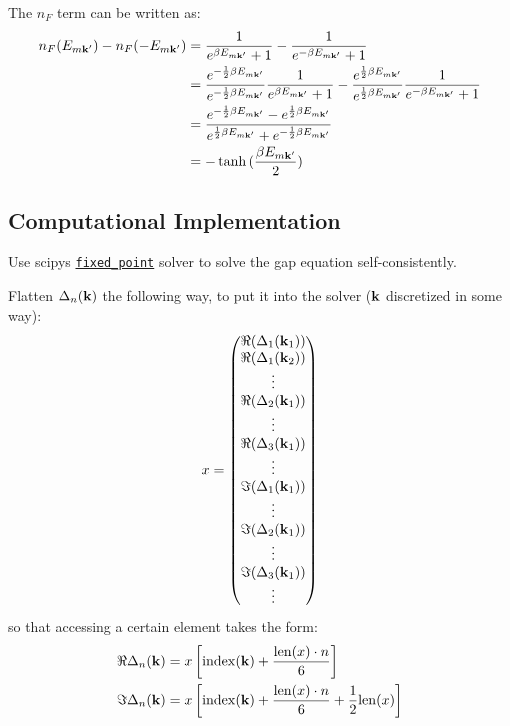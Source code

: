 The \(n_F\) term can be written as:
\begin{align}
    n_F(E_{m \bm{\mathrm{k}}^{\prime}}) - n_F(-E_{m \bm{\mathrm{k}}^{\prime}}) &= \frac{1}{e^{\beta E_{m \bm{\mathrm{k}}^{\prime}}} + 1} - \frac{1}{e^{-\beta E_{m \bm{\mathrm{k}}^{\prime}}} + 1} \\
    &= \frac{e^{-\frac{1}{2} \beta E_{m \bm{\mathrm{k}}^{\prime} }}}{e^{-\frac{1}{2} \beta E_{m \bm{\mathrm{k}}^{\prime}}}} \frac{1}{e^{\beta E_{m \bm{\mathrm{k}}^{\prime}}} + 1} - \frac{e^{\frac{1}{2} \beta E_{m \bm{\mathrm{k}}^{\prime}}}}{e^{\frac{1}{2} \beta E_{m \bm{\mathrm{k}}^{\prime}}}} \frac{1}{e^{-\beta E_{m \bm{\mathrm{k}}^{\prime}}} + 1} \\
    &= \frac{e^{-\frac{1}{2} \beta E_{m \bm{\mathrm{k}}^{\prime}}} - e^{\frac{1}{2} \beta E_{m \bm{\mathrm{k}}^{\prime}}}}{e^{\frac{1}{2} \beta E_{m \bm{\mathrm{k}}^{\prime}}} + e^{-\frac{1}{2} \beta E_{m \bm{\mathrm{k}}^{\prime} }}} \\
    &= -\tanh{(\frac{\beta E_{m \bm{\mathrm{k}}^{\prime}}}{2})}
\end{align}

\subsection{Computational Implementation}

Use scipys \href{https://docs.scipy.org/doc/scipy/reference/generated/scipy.optimize.fixed_point.html}{\texttt{fixed\_point}} solver to solve the gap equation self-consistently.

Flatten \(\Delta_n (\bm{\mathrm{k}})\) the following way, to put it into the solver (\(\bm{\mathrm{k}}\) discretized in some way):
\begin{equation}
    x = \begin{pmatrix}
        \Re{(\Delta_1 (\bm{\mathrm{k}}_1))} \\
        \Re{(\Delta_1 (\bm{\mathrm{k}}_2))} \\
        \vdots \\
        \Re{(\Delta_2(\bm{\mathrm{k}}_1))} \\
        \vdots \\
        \Re{(\Delta_3(\bm{\mathrm{k}}_1))} \\
        \vdots \\
        \Im{(\Delta_1(\bm{\mathrm{k}}_1))} \\
        \vdots \\
        \Im{(\Delta_2(\bm{\mathrm{k}}_1))} \\
        \vdots \\
        \Im{(\Delta_3(\bm{\mathrm{k}}_1))} \\
        \vdots \\
    \end{pmatrix}
\end{equation}
so that accessing a certain element takes the form:
\begin{align}
    \Re{\Delta_n (\bm{\mathrm{k}})} &= x\left[\mathrm{index}(\bm{\mathrm{k}}) + \frac{\mathrm{len}(x) \cdot n}{6} \right] \\
    \Im{\Delta_n (\bm{\mathrm{k}})} &= x\left[\mathrm{index}(\bm{\mathrm{k}}) + \frac{\mathrm{len}(x) \cdot n}{6} + \frac{1}{2} \mathrm{len}(x) \right]
\end{align}
